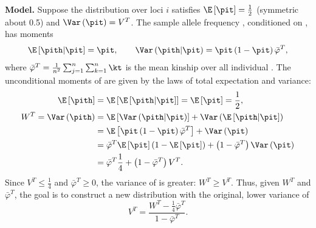 \documentclass[11pt]{article}
\begin{document}
\textbf{Model.}
Suppose the \pit distribution over loci $i$ satisfies $\E \left[ \pit \right] = \frac{1}{2}$ (symmetric about 0.5) and $\Var \left( \pit \right) = V^T$.
The sample allele frequency \pith, conditioned on \pit, has moments
$$
\E \left[ \pith \middle| \pit \right]
=
\pit
, \quad\quad
\Var \left( \pith \middle| \pit \right)
=
\pit \left( 1 - \pit \right) \bar{\varphi}^T
,
$$
where $\bar{\varphi}^T = \frac{1}{n^2} \sum_{j=1}^n \sum_{k=1}^n \kt$ is the mean kinship over all individual \citep{ochoa_estimating_2021}.
The unconditional moments of \pith are given by the laws of total expectation and variance:
\begin{align*}
  \E \left[ \pith \right]
  &=
    \E \left[ \E \left[ \pith \middle| \pit \right] \right]
    =
    \E \left[ \pit \right]
    =
    \frac{1}{2}
    , \\
  W^T
  =
  \Var \left( \pith \right)
  &=
    \E \left[ \Var \left( \pith \middle| \pit \right) \right ]
    + \Var \left( \E \left[ \pith \middle| \pit \right] \right)
  \\
  &=
    \E \left[ \pit \left( 1 - \pit \right) \bar{\varphi}^T \right]
    + \Var \left( \pit \right)
  \\
  &=
    \bar{\varphi}^T \E \left[ \pit \right] \left( 1 - \E \left[ \pit \right] \right)
    + \left( 1 - \bar{\varphi}^T \right) \Var \left( \pit \right)
  \\
  &=
    \bar{\varphi}^T \frac{1}{4}
    + \left( 1 - \bar{\varphi}^T \right) V^T
    .
\end{align*}
Since $V^T \le \frac{1}{4}$ and $\bar{\varphi}^T \ge 0$, the variance of \pith is greater: $W^T \ge V^T$.
Thus, given $W^T$ and $\bar{\varphi}^T$, the goal is to construct a new distribution with the original, lower variance of
\begin{equation}
  \label{eq:var_undiff}
  V^T
  =
  \frac{ W^T - \frac{1}{4} \bar{\varphi}^T }{ 1 - \bar{\varphi}^T }
  .
\end{equation}
\end{document}
